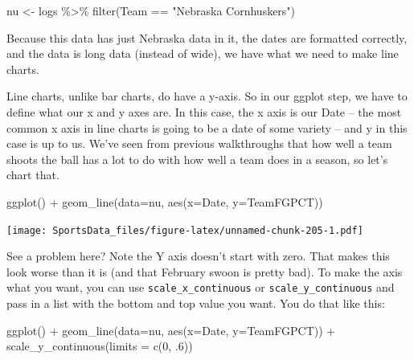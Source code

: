 \documentclass[
]{book}
\newenvironment{Shaded}{\begin{snugshade}}{\end{snugshade}}
\newcommand{\AttributeTok}[1]{\textcolor[rgb]{0.77,0.63,0.00}{#1}}
\newcommand{\DecValTok}[1]{\textcolor[rgb]{0.00,0.00,0.81}{#1}}
\newcommand{\FunctionTok}[1]{\textcolor[rgb]{0.00,0.00,0.00}{#1}}
\newcommand{\NormalTok}[1]{#1}
\newcommand{\OtherTok}[1]{\textcolor[rgb]{0.56,0.35,0.01}{#1}}
\newcommand{\SpecialCharTok}[1]{\textcolor[rgb]{0.00,0.00,0.00}{#1}}
\newcommand{\StringTok}[1]{\textcolor[rgb]{0.31,0.60,0.02}{#1}}
\begin{document}
\begin{Shaded}
\begin{Highlighting}[]
\NormalTok{nu }\OtherTok{\textless{}{-}}\NormalTok{ logs }\SpecialCharTok{\%\textgreater{}\%} \FunctionTok{filter}\NormalTok{(Team }\SpecialCharTok{==} \StringTok{"Nebraska Cornhuskers"}\NormalTok{)}
\end{Highlighting}
\end{Shaded}

Because this data has just Nebraska data in it, the dates are formatted correctly, and the data is long data (instead of wide), we have what we need to make line charts.

Line charts, unlike bar charts, do have a y-axis. So in our ggplot step, we have to define what our x and y axes are. In this case, the x axis is our Date -- the most common x axis in line charts is going to be a date of some variety -- and y in this case is up to us. We've seen from previous walkthroughs that how well a team shoots the ball has a lot to do with how well a team does in a season, so let's chart that.

\begin{Shaded}
\begin{Highlighting}[]
\FunctionTok{ggplot}\NormalTok{() }\SpecialCharTok{+} \FunctionTok{geom\_line}\NormalTok{(}\AttributeTok{data=}\NormalTok{nu, }\FunctionTok{aes}\NormalTok{(}\AttributeTok{x=}\NormalTok{Date, }\AttributeTok{y=}\NormalTok{TeamFGPCT))}
\end{Highlighting}
\end{Shaded}

\texttt{[image: SportsData\_files/figure-latex/unnamed-chunk-205-1.pdf]}

See a problem here? Note the Y axis doesn't start with zero. That makes this look worse than it is (and that February swoon is pretty bad). To make the axis what you want, you can use \texttt{scale\_x\_continuous} or \texttt{scale\_y\_continuous} and pass in a list with the bottom and top value you want. You do that like this:

\begin{Shaded}
\begin{Highlighting}[]
\FunctionTok{ggplot}\NormalTok{() }\SpecialCharTok{+} 
  \FunctionTok{geom\_line}\NormalTok{(}\AttributeTok{data=}\NormalTok{nu, }\FunctionTok{aes}\NormalTok{(}\AttributeTok{x=}\NormalTok{Date, }\AttributeTok{y=}\NormalTok{TeamFGPCT)) }\SpecialCharTok{+} 
  \FunctionTok{scale\_y\_continuous}\NormalTok{(}\AttributeTok{limits =} \FunctionTok{c}\NormalTok{(}\DecValTok{0}\NormalTok{, .}\DecValTok{6}\NormalTok{))}
\end{Highlighting}
\end{Shaded}
\end{document}
